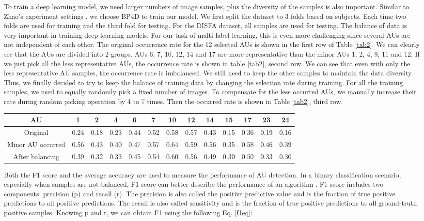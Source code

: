 \documentclass[a4paper, 10pt, conference]{ieeeconf}      %
\begin{document}
To train a deep learning model, we need larger numbers of image samples, plus the diversity of the samples is also important. Similar to Zhao's experiment settings \cite{p22}, we choose BP4D to train our model. We first split the dataset to 3 folds based on subjects. Each time two folds are used for training and the third fold for testing. For the DISFA dataset, all samples are used for testing.
The balance of data is very important in training deep learning models. For our task of multi-label learning, this is even more challenging since several AUs are not independent of each other. The original occurrence rate for the 12 selected AUs is shown in the first row of Table \ref{tab2}. We can clearly see that the AUs are divided into 2 groups. AUs 6, 7, 10, 12, 14 and 17 are more representative than the minor AUs 1, 2, 4, 9, 11 and 12. If we just pick all the less representative AUs, the occurrence rate is shown in table \ref{tab2}, second row.
We can see that even with only the less representative AU samples, the occurrence rate is imbalanced. We still need to keep the other samples to maintain the data diversity. Thus, we finally decided to try to keep the balance of training data by changing the selection rate during training. For all the training samples, we used to equally randomly pick a fixed number of images. To compensate for the less occurred AUs, we manually increase their rate during random picking operation by 4 to 7 times. Then the occurred rate is shown in Table \ref{tab2}, third row.

\begin{table*}
\caption{BP4D samples balancing for AU occurrence}
\label{tab2}
\begin{center}
\begin{tabular}{|c|c|c|c|c|c|c|c|c|c|c|c|c|}
\hline
AU & 1 & 2 & 4 & 6 & 7 & 10 & 12 & 14 & 15 & 17 & 23 & 24\\
\hline
Original & 0.24 & 0.18 & 0.23 & 0.44 & 0.52 & 0.58 & 0.57 & 0.43 & 0.15 & 0.36 & 0.19 & 0.16\\
Minor AU occurred & 0.56 & 0.43 & 0.40 & 0.47 & 0.57 & 0.64 & 0.59 & 0.56 & 0.35 & 0.58 & 0.46 & 0.39\\
After balancing & 0.39 & 0.32 & 0.33 & 0.45 & 0.54 & 0.60 & 0.56 & 0.49 & 0.30 & 0.50 & 0.33 & 0.30\\
\hline
\end{tabular}
\end{center}
\end{table*}


{\color {black} Both the F1 score and the average accuracy are used to measure the performance of AU detection. In a binary classification scenario, especially when samples are not balanced, F1 score can better describe the performance of an algorithm \cite{p9,p10}. F1 score includes two components: precision (p) and recall (r). The precision is also called the positive predictive value and is the fraction of true positive predictions to all positive predictions. The recall is also called sensitivity and is the fraction of true positive predictions to all ground-truth positive samples.  Knowing p and r, we can obtain F1 using the following Eq. \ref{f1eq}}:
\end{document}
